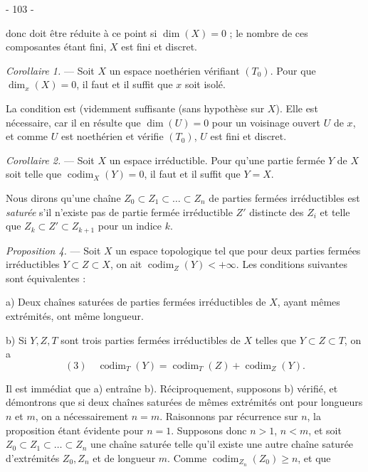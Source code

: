 \newpage


- 103 -

donc doit être réduite à ce point si $\dim(X)=0$ ; le nombre de ces composantes étant fini, $X$ est fini et discret.

\emph{Corollaire 1.} — Soit $X$ un espace noethérien vérifiant $(T_0)$. Pour que $\dim_x(X)=0$, il faut et il suffit que $x$ soit isolé.

La condition est (videmment suffisante (sans hypothèse sur $X$). Elle est nécessaire, car il en résulte que $\dim(U)=0$ pour un voisinage ouvert $U$ de $x$, et comme $U$ est noethérien et vérifie $(T_0)$, $U$ est fini et discret.

\emph{Corollaire 2.} — Soit $X$ un espace irréductible. Pour qu'une partie fermée $Y$ de $X$ soit telle que $\operatorname{codim}_X(Y)=0$, il faut et il suffit que $Y=X$.

Nous dirons qu'une chaîne $Z_0 \subset Z_1 \subset \dots \subset Z_n$ de parties fermées irréductibles est \emph{saturée} s'il n'existe pas de partie fermée irréductible $Z'$ distincte des $Z_i$ et telle que $Z_k \subset Z' \subset Z_{k+1}$ pour un indice $k$.

\emph{Proposition 4.} — Soit $X$ un espace topologique tel que pour deux parties fermées irréductibles $Y \subset Z \subset X$, on ait $\operatorname{codim}_Z(Y) < +\infty$. Les conditions suivantes sont équivalentes :

a) Deux chaînes saturées de parties fermées irréductibles de $X$, ayant mêmes extrémités, ont même longueur.

b) Si $Y, Z, T$ sont trois parties fermées irréductibles de $X$ telles que $Y \subset Z \subset T$, on a
$$(3) \quad \operatorname{codim}_T(Y) = \operatorname{codim}_T(Z) + \operatorname{codim}_Z(Y) \text{.} $$

Il est immédiat que a) entraîne b). Réciproquement, supposons b) vérifié, et démontrons que si deux chaînes saturées de mêmes extrémités ont pour longueurs $n$ et $m$, on a nécessairement $n=m$. Raisonnons par récurrence sur $n$, la proposition étant évidente pour $n=1$. Supposons donc $n > 1$, $n < m$, et soit $Z_0 \subset Z_1 \subset \dots \subset Z_n$ une chaîne saturée telle qu'il existe une autre chaîne saturée d'extrémités $Z_0, Z_n$ et de longueur $m$. Comme $\operatorname{codim}_{Z_n}(Z_0) \ge n$, et que

\newpage



